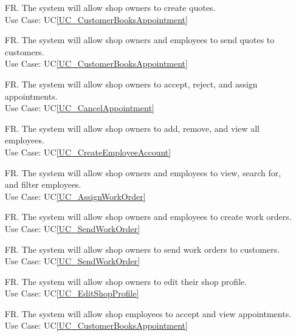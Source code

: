 \documentclass[12pt]{article}
\newcounter{reqnum} %
\begin{document}
\begin{itemize}
\item[FR\refstepcounter{reqnum}\thereqnum \label{R_CreateQuote}.] The system will allow shop owners to create quotes.\\
Use Case: UC\ref{UC_CustomerBooksAppointment}

\item[FR\refstepcounter{reqnum}\thereqnum \label{R_SendQuote}.] The system will allow shop owners and employees to send quotes to customers.\\
Use Case: UC\ref{UC_CustomerBooksAppointment}

\item[FR\refstepcounter{reqnum}\thereqnum \label{R_OwnerAppointment}.] The system will allow shop owners to accept, reject, and assign appointments.\\
Use Case: UC\ref{UC_CancelAppointment}

\item[FR\refstepcounter{reqnum}\thereqnum \label{R_EditEmployee}.] The system will allow shop owners to add, remove, and view all employees.\\
Use Case: UC\ref{UC_CreateEmployeeAccount}

\item[FR\refstepcounter{reqnum}\thereqnum \label{R_ViewEmployee}.] The system will allow shop owners and employees to view, search for, and filter employees.\\
Use Case: UC\ref{UC_AssignWorkOrder}

\item[FR\refstepcounter{reqnum}\thereqnum \label{R_CreateWorkOrder}.] The system will allow shop owners and employees to create work orders.\\
Use Case: UC\ref{UC_SendWorkOrder}

\item[FR\refstepcounter{reqnum}\thereqnum \label{R_SendWorkOrder}.] The system will allow shop owners to send work orders to customers.\\
Use Case: UC\ref{UC_SendWorkOrder}

\item[FR\refstepcounter{reqnum}\thereqnum \label{R_EditShopProfile}.] The system will allow shop owners to edit their shop profile.\\
Use Case: UC\ref{UC_EditShopProfile}

\item[FR\refstepcounter{reqnum}\thereqnum \label{R_EmployeeAppointment}.] The system will allow shop employees to accept and view appointments.\\
Use Case: UC\ref{UC_CustomerBooksAppointment}


\end{itemize}
\end{document}
